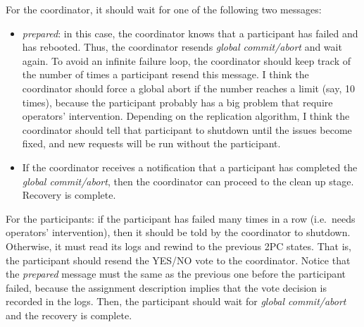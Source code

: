 For the coordinator, it should wait for one of the following two messages:
\begin{itemize}
\item
\emph{prepared}:
in this case, the coordinator knows that a participant has failed and has rebooted.
Thus, the coordinator resends \emph{global commit/abort} and wait again.
To avoid an infinite failure loop, the coordinator should keep track of the number of times a participant resend this message.
I think the coordinator should force a global abort if the number reaches a limit (say, 10 times), because the participant probably has a big problem that require operators' intervention.
Depending on the replication algorithm, I think the coordinator should tell that participant to shutdown until the issues become fixed, and new requests will be run without the participant.
\item
If the coordinator receives a notification that a participant has completed the \emph{global commit/abort}, then the coordinator can proceed to the clean up stage.
Recovery is complete.
\end{itemize}

For the participants:
if the participant has failed many times in a row (i.e.\ needs operators' intervention), then it should be told by the coordinator to shutdown.
Otherwise, it must read its logs and rewind to the previous 2PC states.
That is, the participant should resend the YES/NO vote to the coordinator.
Notice that the \emph{prepared} message must the same as the previous one before the participant failed, because the assignment description implies that the vote decision is recorded in the logs.
Then, the participant should wait for \emph{global commit/abort} and the recovery is complete.
